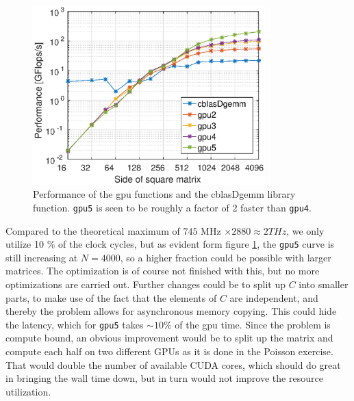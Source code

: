 \begin{figure}
\centering
\includegraphics[width = 0.8\textwidth]{fig/gpu5.eps}
\caption{Performance of the gpu functions and the cblasDgemm library function. \texttt{gpu5} is seen to be roughly a factor of 2 faster than \texttt{gpu4}.}
\label{fig:gpu5}
\end{figure}
Compared to the theoretical maximum of $745$ MHz $\times 2880 \approx 2 THz$, we only utilize 10 \% of the clock cycles, but as evident form figure \ref{fig:gpu5}, the \texttt{gpu5} curve is still increasing at $N =4000$, so a higher fraction could be possible with larger matrices. The optimization is of course not finished with this, but no more optimizations are carried out. Further changes could be to split up $C$ into smaller parts, to make use of the fact that the elements of $C$ are independent, and thereby the problem allows for asynchronous memory copying. This could hide the latency, which for \texttt{gpu5} takes $\sim 10\%$ of the gpu time. Since the problem is compute bound, an obvious improvement would be to split up the matrix and compute each half on two different GPUs as it is done in the Poisson exercise. That would double the number of available CUDA cores, which should do great in bringing the wall time down, but in turn would not improve the resource utilization.

